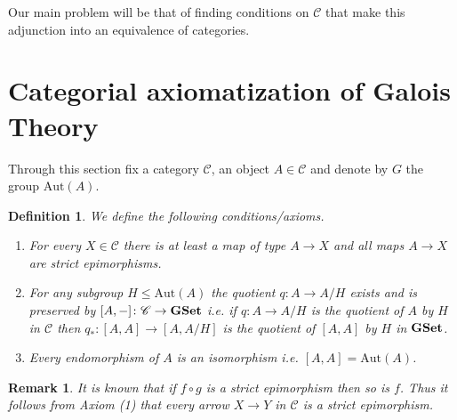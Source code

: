 \documentclass[italian, 12pt, reqno]{article}
\theoremstyle{myteo}
\newtheorem{definition}[theorem]{Definition}
\newtheorem{remark}[theorem]{Remark}
\numberwithin{equation}{section}
\newcommand{\cat}[1]{\mathscr{#1}}
\newcommand{\aut}{\text{Aut}}
\newcommand{\gset}{\text{\textbf{GSet}}}
\newcommand{\homs}[2]{[#1, #2]}
\newcommand{\fun}[3]{#1\colon#2\to #3}
\begin{document}
\begin{figure}[h]
  \begin{center}
    \hspace{2cm}
  \end{center}
  \caption{}
  \label{diagram:bijection}
\end{figure}

Our main problem will be that of finding conditions on \(\cat{C}\) that make this adjunction into an equivalence of categories.

\section{Categorial axiomatization of Galois Theory}
\label{sec:axioms}

Through this section fix a category \(\cat{C}\), an object \(A\in\cat{C}\) and denote by \(G\) the group \(\text{Aut}(A)\).

\begin{definition}
  \label{def:axioms}
  We define the following conditions/axioms.
  \begin{enumerate}
  \item For every \(X\in\cat{C}\) there is at least a map of type \(A\to X\) and all maps \(A\to X\) are strict epimorphisms.
  \item For any subgroup \(H\leq \aut(A)\) the quotient \(\fun{q}{A}{A/H}\) exists and is preserved by \(\fun{\homs{A}{-}}{\cat{C}}{\gset}\) i.e. if \(q: A \to A/H\) is the quotient of \(A\) by \(H\) in \(\cat{C}\) then \(q_* : [A, A] \to [A, A/H]\) is the quotient of \([A, A]\) by \(H\) in \(\gset\).
  \item Every endomorphism of \(A\) is an isomorphism i.e. \(\homs{A}{A} = \aut(A)\).
  \end{enumerate}
\end{definition}

\begin{remark}
  \label{rem:all_strict_epi}
  It is known that if \(f\circ g\) is a strict epimorphism then so is \(f\).
  Thus it follows from Axiom (1) that every arrow \(X\to Y\) in \(\cat{C}\) is a strict epimorphism.
\end{remark}
\end{document}

